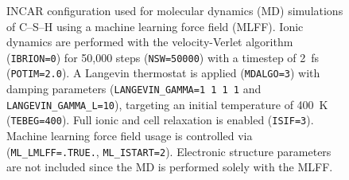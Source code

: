 \begin{figure}[H]
    \centering
    \begin{threeparttable}
        \caption{INCAR configuration used for molecular dynamics (MD) simulations of C--S--H using a machine learning force field (MLFF). Ionic dynamics are performed with the velocity-Verlet algorithm (\texttt{IBRION=0}) for 50,000 steps (\texttt{NSW=50000}) with a timestep of 2~fs (\texttt{POTIM=2.0}). A Langevin thermostat is applied (\texttt{MDALGO=3}) with damping parameters (\texttt{LANGEVIN\_GAMMA=1 1 1 1} and \texttt{LANGEVIN\_GAMMA\_L=10}), targeting an initial temperature of 400~K (\texttt{TEBEG=400}). Full ionic and cell relaxation is enabled (\texttt{ISIF=3}). Machine learning force field usage is controlled via (\texttt{ML\_LMLFF=.TRUE.}, \texttt{ML\_ISTART=2}). Electronic structure parameters are not included since the MD is performed solely with the MLFF.}
        \label{fig:incar_md_parallel}
\end{threeparttable}
\end{figure}

